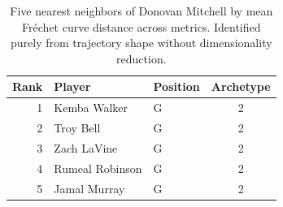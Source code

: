 \begin{table}[htbp]
  \centering\small
  \begin{tabular}{rllc}
    \toprule
    Rank & Player & Position & Archetype \\
    \midrule
    1 & Kemba Walker & G & 2 \\
    2 & Troy Bell & G & 2 \\
    3 & Zach LaVine & G & 2 \\
    4 & Rumeal Robinson & G & 2 \\
    5 & Jamal Murray & G & 2 \\
    \bottomrule
  \end{tabular}
  \caption{Five nearest neighbors of Donovan Mitchell by mean Fr\'{e}chet curve distance across metrics. Identified purely from trajectory shape without dimensionality reduction.}
  \label{tab:Donovan_Mitchell_frechet_curve_neighbors}
\end{table}

